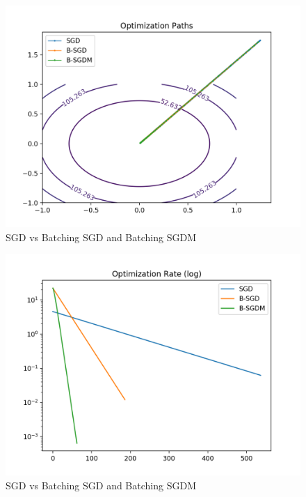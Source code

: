 \documentclass[twoside,11pt]{homework}
\DeclarePairedDelimiter{\2norm}{\lVert}{\rVert^2_2}
\newcommand{\1}[1]{\mathds{1}\left[#1\right]}
\begin{document}
\begin{enumerate}[\bf (i)]
\begin{enumerate}
        \begin{figure}[h!]
         \centering
         \includegraphics[width=6in]{img/batch.png}
         \caption{SGD vs Batching SGD and Batching SGDM}
         \label{fig:sgdm}
       \end{figure}

       \begin{figure}[h!]
         \centering
         \includegraphics[width=6in]{img/batch2.png}
         \caption{SGD vs Batching SGD and Batching SGDM}
         \label{fig:sgdm2}
       \end{figure}


\end{enumerate}
\end{enumerate}
\end{document}
